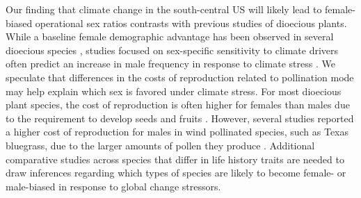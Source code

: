 \documentclass[9pt,twocolumn,twoside,lineno]{pnas-new}
\begin{document}
Our finding that climate change in the south-central US will likely lead to female-biased operational sex ratios contrasts with previous studies of dioecious plants. 
While a baseline female demographic advantage has been observed in several dioecious species \citep{bawa1980evolution,sasaki2019complex}, studies focused on sex-specific sensitivity to climate drivers often predict an increase in male frequency in response to climate stress \citep{petry2016sex,hultine2016climate}. 
We speculate that differences in the costs of reproduction related to pollination mode may help explain which sex is favored under climate stress. 
For most dioecious plant species, the cost of reproduction is often higher for females than males due to the requirement to develop seeds and fruits \citep{cipollini1994sexual}. %
However, several studies reported a higher cost of reproduction for males in wind pollinated species, such as Texas bluegrass, due to the larger amounts of pollen they produce \citep{burli2022environmental,field2013comparative}. 
Additional comparative studies across species that differ in life history traits are needed to draw inferences regarding which types of species are likely to become female- or male-biased in response to global change stressors.
\end{document}
